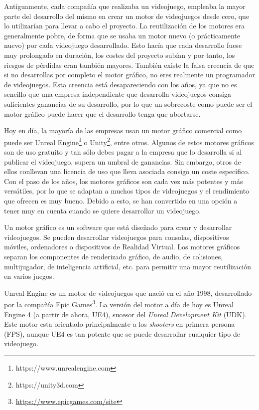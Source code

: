 Antiguamente, cada compañía que realizaba un videojuego, empleaba la mayor parte del desarrollo del mismo en crear un motor de videojuegos desde cero, que lo utilizarían para llevar a cabo el proyecto. La reutilización de los motores era generalmente pobre, de forma que se usaba un motor nuevo (o prácticamente nuevo) por cada videojuego desarrollado. Esto hacía que cada desarrollo fuese muy prolongado en duración, los costes del proyecto subían y por tanto, los riesgos de pérdidas eran también mayores. También existe la falsa creencia de que si no desarrollas por completo el motor gráfico, no eres realmente un programador de videojuegos. Esta creencia está desapareciendo con los años, ya que no es sencillo que una empresa independiente que desarrolla videojuegos consiga suficientes ganancias de su desarrollo, por lo que un sobrecoste como puede ser el motor gráfico puede hacer que el desarrollo tenga que abortarse.

Hoy en día, la mayoría de las empresas usan un motor gráfico comercial como puede ser Unreal Engine\footnote{https://www.unrealengine.com} o Unity\footnote{https://unity3d.com}, entre otros. Algunos de estos motores gráficos son de uso gratuito y tan sólo debes pagar a la empresa que lo desarrolla si al publicar el videojuego, supera un umbral de ganancias. Sin embargo, otros de ellos conllevan una licencia de uso que lleva asociada consigo un coste específico. Con el paso de los años, los motores gráficos son cada vez más potentes y más versátiles, por lo que se adaptan a muchos tipos de videojuegos y el rendimiento que ofrecen es muy bueno. Debido a esto, se han convertido en una opción a tener muy en cuenta cuando se quiere desarrollar un videojuego. 

Un motor gráfico \cite{5} es un software que está diseñado para crear y desarrollar videojuegos. Se pueden desarrollar videojuegos para consolas, dispositivos móviles, ordenadores o dispositivos de Realidad Virtual. Los motores gráficos separan los componentes de renderizado gráfico, de audio, de colisiones, multijugador, de inteligencia artificial, etc. para permitir una mayor reutilización en varios juegos.

Unreal Engine es un motor de videojuegos que nació en el año 1998, desarrollado por la compañía Epic Games\footnote{\url{https://www.epicgames.com/site}}. La versión del motor a día de hoy es Unreal Engine 4 (a partir de ahora, UE4), sucesor del \textit{Unreal Development Kit} (UDK). Este motor esta orientado principalmente a los \textit{shooters} en primera persona (FPS), aunque UE4 es tan potente que se puede desarrollar cualquier tipo de videojuego.

